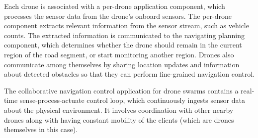 \par Each drone is associated with a per-drone application component, which processes the sensor data from the drone's onboard sensors. The per-drone component extracts relevant information from the sensor stream, such as vehicle counts. The extracted information is communicated to the navigating planning component, which determines whether the drone should remain in the current region of the road segment, or start monitoring another region. Drones also communicate among themselves by sharing location updates and information about detected obstacles so that they can perform fine-grained navigation control.

\par The collaborative navigation control application for drone swarms contains a real-time sense-process-actuate control loop, which continuously ingests sensor data about the physical environment. It involves coordination with other nearby drones along with having constant mobility of the clients (which are drones themselves in this case).


